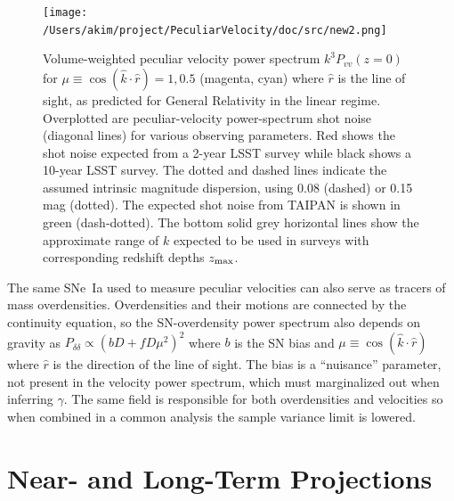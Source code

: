 \documentclass[11pt, oneside]{article}   	%
\begin{document}
\begin{figure}[h]
\centering
\texttt{[image: /Users/akim/project/PeculiarVelocity/doc/src/new2.png]}
\caption{Volume-weighted peculiar velocity power spectrum $k^3P_{vv}(z=0)$ for $\mu \equiv \cos{(\hat{k} \cdot \hat{r})}=1, 0.5$ (magenta, cyan) 
where $\hat{r}$ is the line of sight, as predicted for General Relativity in the linear regime.
Overplotted are peculiar-velocity power-spectrum shot noise  (diagonal lines) for various observing parameters.  Red shows the shot noise expected from a 2-year LSST survey
while black shows a 10-year LSST survey.  The dotted and dashed lines indicate the assumed intrinsic magnitude dispersion, using 0.08 (dashed) or 0.15 mag (dotted).  The expected shot
noise from TAIPAN is shown in green (dash-dotted). 
%
The bottom solid grey horizontal lines show the approximate range of $k$ expected to be used in surveys with corresponding
redshift depths $z_{\rm max}$.
\label{power:fig}}
\end{figure}

The same SNe~Ia used  to measure peculiar velocities can also serve as tracers of mass overdensities.  Overdensities and their motions are connected by the
continuity equation, so the SN-overdensity power spectrum also depends on gravity 
as $P_{\delta \delta }\propto (bD + fD\mu^2)^2$ where $b$ is the SN bias and $\mu\equiv \cos{(\hat{k} \cdot \hat{r})}$ where $\hat{r}$ is the direction of
the line of sight.  
The bias is a ``nuisance'' parameter, not present in the velocity power spectrum, which must marginalized out when inferring $\gamma$.
The same field is responsible for both overdensities and velocities so when combined in a common analysis the sample variance limit is lowered.


\section{Near- and Long-Term Projections}
\end{document}
